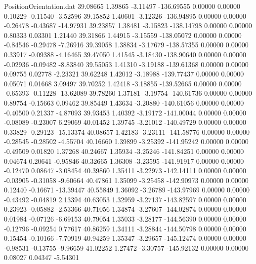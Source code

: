 \begin{filecontents}{PositionOrientation.dat}
  39.08665    1.39865   -3.11497  -136.69555    0.00000    0.00000    0.10229   -0.11540   -3.52596
  39.15852    1.40601   -3.12326  -136.94895    0.00000    0.00000   -0.26478   -0.43687  -14.97931
  39.23857    1.38481   -3.15823  -138.14798    0.00000    0.00000    0.80333    0.03301    1.21440
  39.31866    1.44915   -3.15559  -138.05072    0.00000    0.00000   -0.84546   -0.29478   -7.26916
  39.39058    1.38834   -3.17679  -138.57355    0.00000    0.00000    0.33917   -0.09388   -4.16465
  39.47050    1.41545   -3.18430  -138.90640    0.00000    0.00000   -0.02936   -0.09482   -8.83840
  39.55053    1.41310   -3.19188  -139.61368    0.00000    0.00000    0.09755    0.02778   -2.23321
  39.62248    1.42012   -3.18988  -139.77437    0.00000    0.00000    0.05071    0.01668    3.09497
  39.70252    1.42418   -3.18855  -139.52665    0.00000    0.00000   -0.65393   -0.11228  -13.62089
  39.78260    1.37181   -3.19754  -140.61736    0.00000    0.00000    0.89754   -0.15663    0.09462
  39.85449    1.43634   -3.20880  -140.61056    0.00000    0.00000   -0.40500    0.21337   -4.87093
  39.93453    1.40392   -3.19172  -141.00044    0.00000    0.00000   -0.08089   -0.23007    6.29069
  40.01452    1.39745   -3.21012  -140.49729    0.00000    0.00000    0.33829   -0.29123  -15.13374
  40.08657    1.42183   -3.23111  -141.58776    0.00000    0.00000   -0.28545   -0.28502   -4.55704
  40.16660    1.39899   -3.25392  -141.95242    0.00000    0.00000   -0.49509    0.01820    1.37268
  40.24667    1.35934   -3.25246  -141.84251    0.00000    0.00000    0.04674    0.20641   -0.95846
  40.32665    1.36308   -3.23595  -141.91917    0.00000    0.00000   -0.12470    0.08647   -3.08454
  40.39860    1.35411   -3.22973  -142.14111    0.00000    0.00000   -0.03905   -0.31058   -9.60664
  40.47861    1.35099   -3.25458  -142.90973    0.00000    0.00000    0.12440   -0.16671  -13.39447
  40.55849    1.36092   -3.26789  -143.97969    0.00000    0.00000   -0.43492   -0.04819    2.13394
  40.63053    1.32959   -3.27137  -143.82597    0.00000    0.00000    0.23923   -0.05882   -2.53366
  40.71056    1.34874   -3.27607  -144.02874    0.00000    0.00000    0.01984   -0.07126   -6.69153
  40.79054    1.35033   -3.28177  -144.56390    0.00000    0.00000   -0.12796   -0.09254    0.77617
  40.86259    1.34111   -3.28844  -144.50798    0.00000    0.00000    0.15454   -0.10166   -7.70919
  40.94259    1.35347   -3.29657  -145.12474    0.00000    0.00000   -0.98531   -0.13755   -9.96659
  41.02252    1.27472   -3.30757  -145.92132    0.00000    0.00000    0.08027    0.04347   -5.54301

\end{filecontents}
